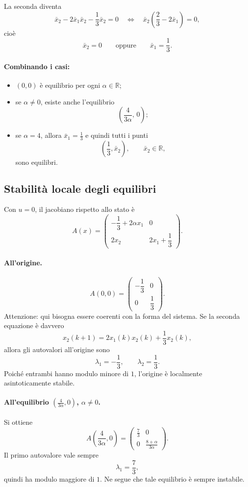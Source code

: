 La seconda diventa
\[
\bar x_2 - 2\bar x_1\bar x_2 - \frac13 \bar x_2 = 0
\quad\Longleftrightarrow\quad
\bar x_2\left(\frac23 - 2\bar x_1\right)=0,
\]
cio\`e
\[
\bar x_2=0
\qquad \text{oppure} \qquad
\bar x_1=\frac13.
\]

\paragraph{Combinando i casi:}
\begin{itemize}
    \item \((0,0)\) \`e equilibrio per ogni \(\alpha\in\mathbb R\);
    \item se \(\alpha\neq 0\), esiste anche l'equilibrio
    \[
    \left(\frac{4}{3\alpha},\,0\right);
    \]
    \item se \(\alpha=4\), allora \(\bar x_1=\frac13\) e quindi tutti i punti
    \[
    \left(\frac13,\bar x_2\right),\qquad \bar x_2\in\mathbb R,
    \]
    sono equilibri.
\end{itemize}

\subsection{Stabilit\`a locale degli equilibri}

Con \(u=0\), il jacobiano rispetto allo stato \`e
\[
A(x)=
\begin{pmatrix}
-\dfrac13 + 2\alpha x_1 & 0\\[8pt]
2x_2 & 2x_1+\dfrac13
\end{pmatrix}.
\]

\paragraph{All'origine.}
\[
A(0,0)=
\begin{pmatrix}
-\dfrac13 & 0\\[6pt]
0 & \dfrac13
\end{pmatrix}.
\]
Attenzione: qui bisogna essere coerenti con la forma del sistema. Se la seconda equazione \`e davvero
\[
x_2(k+1)=2x_1(k)x_2(k)+\frac13 x_2(k),
\]
allora gli autovalori all'origine sono
\[
\lambda_1=-\frac13,
\qquad
\lambda_2=\frac13.
\]
Poich\'e entrambi hanno modulo minore di \(1\), l'origine \`e localmente asintoticamente stabile.

\paragraph{All'equilibrio \(\left(\frac{4}{3\alpha},0\right)\), \(\alpha\neq 0\).}
Si ottiene
\[
A\!\left(\frac{4}{3\alpha},0\right)=
\begin{pmatrix}
\frac73 & 0\\[6pt]
0 & \frac{8+\alpha}{3\alpha}
\end{pmatrix}.
\]
Il primo autovalore vale sempre
\[
\lambda_1=\frac73,
\]
quindi ha modulo maggiore di \(1\). Ne segue che tale equilibrio \`e sempre instabile.


